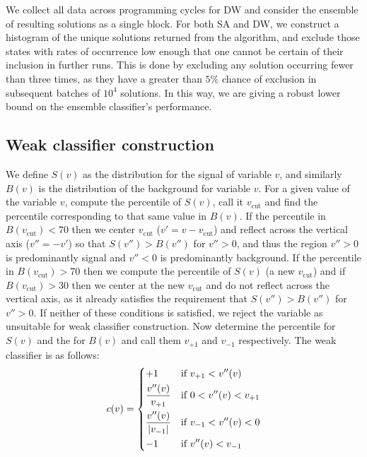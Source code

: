 \documentclass[fleqn,10pt]{wlscirep}
\begin{document}
We collect all data across programming cycles for DW and consider the ensemble of resulting solutions as a single block. For both SA and DW, we construct a histogram of the unique solutions returned from the algorithm, and exclude those states with rates of occurrence low enough that one cannot be certain of their inclusion in further runs. This is done by excluding any solution occurring fewer than three times, as they have a greater than $5\%$ chance of exclusion in subsequent batches of $10^4$ solutions. In this way, we are giving a robust lower bound on the ensemble classifier's performance.

\subsection*{Weak classifier construction}
 We define $S(v)$ as the distribution for the signal of variable $v$, and similarly $B(v)$ is the distribution of the background for variable $v$. For a given value of the variable $v$, compute the  percentile of $S(v)$, call it $v_{\text{cut}}$ and find the percentile corresponding to that same value in $B(v)$. If the percentile in $B(v_{\text{cut}})<70$ then we center $v_{\text{cut}}$ ($v'=v-v_{\text{cut}}$) and reflect across the vertical axis ($v''=-v'$) so that $S(v'')>B(v'')$ for $v''>0$, and thus the region $v''>0$ is predominantly signal and $v''<0$ is predominantly background. If the percentile in $B(v_{\text{cut}})>70$ then we compute the  percentile of $S(v)$ (a new $v_{\text{cut}}$) and if $B(v_{\text{cut}})>30$ then we center at the new $v_{\text{cut}}$ and do not reflect across the  vertical axis, as it already satisfies the requirement that $S(v'')>B(v'')$ for $v''>0$. If neither of these conditions is satisfied, we reject the variable as unsuitable for weak classifier construction. Now determine the  percentile for $S(v)$ and the  for $B(v)$ and call them $v_{+1}$ and $v_{-1}$ respectively. The weak classifier is as follows:
 		\begin{equation}
		c(v) = 
 		\begin{dcases}
 			+1 & \text{if } v_{+1} < v''(v) \\
 			\frac{v''(v)}{v_{+1}} & \text{if } 0<v''(v)<v_{+1} \\
 			\frac{v''(v)}{\abs{v_{-1}}} & \text{if } v_{-1} < v''(v) < 0 \\
 			-1 & \text{if } v''(v) < v_{-1}
 		\end{dcases}
 		 \end{equation}
\end{document}
